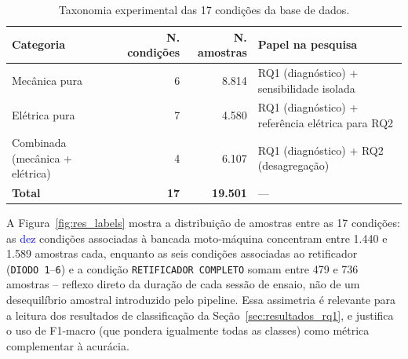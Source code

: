 \documentclass[times,final]{elsarticle}
\begin{document}
\begin{table}[H]
    \centering
    \caption{Taxonomia experimental das 17 condições da base de dados.}
    \label{tab:res_taxonomia}
    \begin{tabular}{@{}lrrl@{}}
        \toprule
        \textbf{Categoria} & \textbf{N. condições} & \textbf{N. amostras} & \textbf{Papel na pesquisa} \\
        \midrule
        Mecânica pura & 6 & 8.814 & RQ1 (diagnóstico) + sensibilidade isolada \\
        Elétrica pura & 7 & 4.580 & RQ1 (diagnóstico) + referência elétrica para RQ2 \\
        Combinada (mecânica + elétrica) & 4 & 6.107 & RQ1 (diagnóstico) + RQ2 (desagregação) \\
        \midrule
        \textbf{Total} & \textbf{17} & \textbf{19.501} & --- \\
        \bottomrule
    \end{tabular}
\end{table}

A Figura~\ref{fig:res_labels} mostra a distribuição de amostras entre as 17 condições: as \textcolor{blue}{dez} condições associadas à bancada moto-máquina concentram entre 1.440 e 1.589 amostras cada, enquanto as seis condições associadas ao retificador (\texttt{DIODO~1}--\texttt{6}) e a condição \texttt{RETIFICADOR COMPLETO} somam entre 479 e 736 amostras -- reflexo direto da duração de cada sessão de ensaio, não de um desequilíbrio amostral introduzido pelo pipeline. Essa assimetria é relevante para a leitura dos resultados de classificação da Seção~\ref{sec:resultados_rq1}, e justifica o uso de F1-macro (que pondera igualmente todas as classes) como métrica complementar à acurácia.
\end{document}
